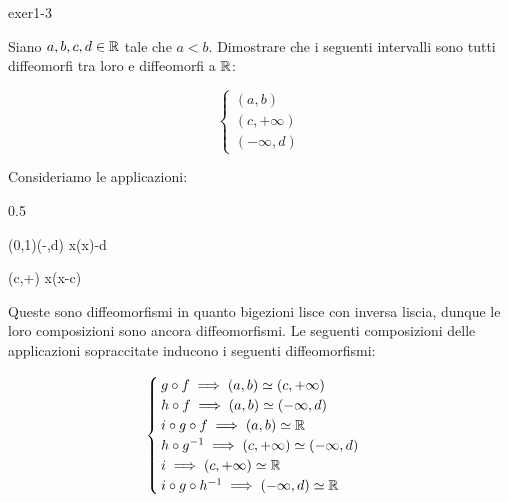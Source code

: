 {exer1-3}
{
Siano $ a,b,c,d \in \mathbb{R} $ tale che $ a<b $. Dimostrare che i seguenti intervalli sono tutti diffeomorfi tra loro e diffeomorfi a $ \mathbb{R} $:

\begin{equation}
	\begin{cases}
		(a,b) \\
		(c,+\infty) \\
		(-\infty,d)
	\end{cases}
\end{equation}
}
{
Consideriamo le applicazioni:

	{0.5}{%
				{(0,1)}{(-\infty,d)}
				{x}{\ln(x)-d}
	
				{(c,+\infty)}{\R}
				{x}{\ln(x-c)}
			}

Queste sono diffeomorfismi in quanto bigezioni lisce con inversa liscia, dunque le loro composizioni sono ancora diffeomorfismi. Le seguenti composizioni delle applicazioni sopraccitate inducono i seguenti diffeomorfismi:

\begin{equation}
	\begin{cases}
		g \circ f \implies (a,b) \simeq (c,+\infty) \\
		h \circ f \implies (a,b) \simeq (-\infty,d) \\
		i \circ g \circ f \implies (a,b) \simeq \mathbb{R} \\
		h \circ g^{-1} \implies (c,+\infty) \simeq (-\infty,d) \\
		i \implies (c,+\infty) \simeq \mathbb{R} \\
		i \circ g \circ h^{-1} \implies (-\infty,d) \simeq \mathbb{R}
	\end{cases}
\end{equation}
}


